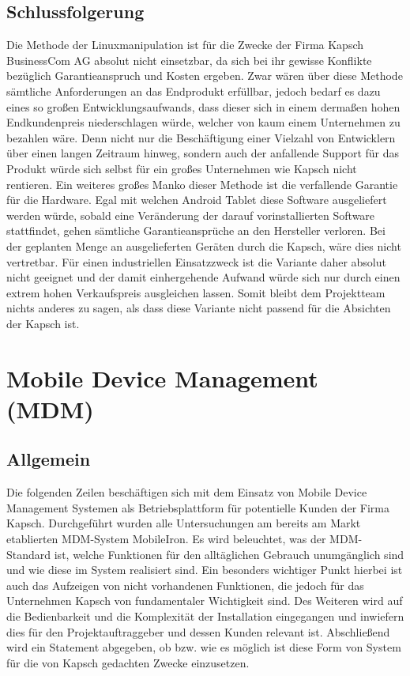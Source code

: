 \subsection{Schlussfolgerung}
Die Methode der Linuxmanipulation ist für die Zwecke der Firma Kapsch BusinessCom AG absolut nicht einsetzbar, da sich bei ihr gewisse Konflikte bezüglich Garantieanspruch und Kosten ergeben. Zwar wären über diese Methode sämtliche Anforderungen an das Endprodukt erfüllbar, jedoch bedarf es dazu eines so großen Entwicklungsaufwands, dass dieser sich in einem dermaßen hohen Endkundenpreis niederschlagen würde, welcher von kaum einem Unternehmen zu bezahlen wäre. Denn nicht nur die Beschäftigung einer Vielzahl von Entwicklern über einen langen Zeitraum hinweg, sondern auch der anfallende Support für das Produkt würde sich selbst für ein großes Unternehmen wie Kapsch nicht rentieren. Ein weiteres großes Manko dieser Methode ist die verfallende Garantie für die Hardware. Egal mit welchen Android Tablet diese Software ausgeliefert werden würde, sobald eine Veränderung der darauf vorinstallierten Software stattfindet, gehen sämtliche Garantieansprüche an den Hersteller verloren. Bei der geplanten Menge an ausgelieferten Geräten durch die Kapsch, wäre dies nicht vertretbar. Für einen industriellen Einsatzzweck ist die Variante daher absolut nicht geeignet und der damit einhergehende Aufwand würde sich nur durch einen extrem hohen Verkaufspreis ausgleichen lassen. Somit bleibt dem Projektteam nichts anderes zu sagen, als dass diese Variante nicht passend für die Absichten der Kapsch ist.

\newpage
\section{Mobile Device Management (MDM)}
\subsection{Allgemein}
Die folgenden Zeilen beschäftigen sich mit dem Einsatz von Mobile Device Management Systemen als Betriebsplattform für potentielle Kunden der Firma Kapsch. Durchgeführt wurden alle Untersuchungen am bereits am Markt etablierten MDM-System MobileIron. Es wird beleuchtet, was der MDM-Standard ist, welche Funktionen für den alltäglichen Gebrauch unumgänglich sind und wie diese im System realisiert sind. Ein besonders wichtiger Punkt hierbei ist auch das Aufzeigen von nicht vorhandenen Funktionen, die jedoch für das Unternehmen Kapsch von fundamentaler Wichtigkeit sind. Des Weiteren wird auf die Bedienbarkeit und die Komplexität der Installation eingegangen und inwiefern dies für den Projektauftraggeber und dessen Kunden relevant ist. Abschließend  wird ein Statement abgegeben, ob bzw. wie es möglich ist diese Form von System für die von Kapsch gedachten Zwecke einzusetzen.
